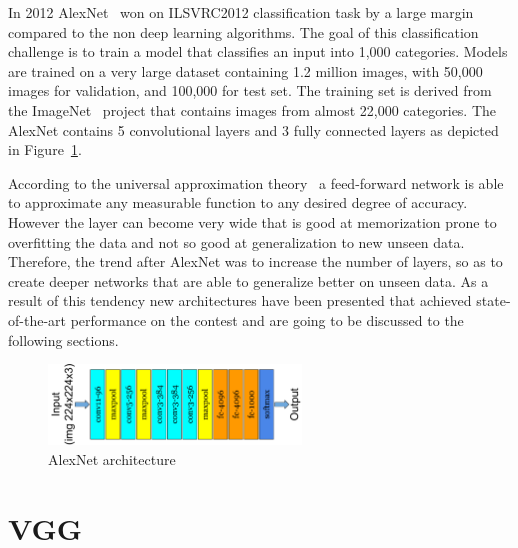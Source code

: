 In 2012 AlexNet~\cite{krizhevsky2012imagenet} won on ILSVRC2012 classification task by a large margin compared to the non deep learning algorithms. The goal of this classification challenge is to train a model that classifies an input into 1,000 categories. Models are trained on a very large dataset containing 1.2 million images, with 50,000 images for validation, and 100,000 for test set. The training set is derived from the ImageNet~\cite{deng2009imagenet} project that contains images from almost 22,000 categories. The AlexNet contains 5 convolutional layers and 3 fully connected layers as depicted in Figure~\ref{fig:Alex_net}.

According to the universal approximation theory~\cite{hornik1989multilayer} a feed-forward network is able to approximate any measurable function to any desired degree of accuracy. However the layer can become very wide that is good at memorization prone to overfitting the data and not so good at generalization to new unseen data. Therefore, the trend after AlexNet was to increase the number of layers, so as to create deeper networks that are able to generalize better on unseen data. As a result of this tendency new architectures have been presented that achieved state-of-the-art performance on the contest and are going to be discussed to the following sections.

\begin{figure}[]
    \begin{center}
    \includegraphics[width=0.6\textwidth]{images/Alex_net.pdf}
    \end{center}
    \caption{AlexNet architecture} \label{fig:Alex_net}
\end{figure}

\section{VGG}

